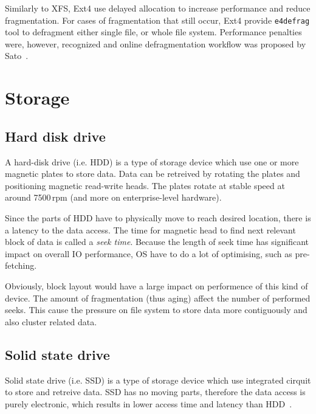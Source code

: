 \documentclass[
  color, %
  table, %
  lof,   %
  lot,   %
]{fithesis3}
\begin{document}
Similarly to XFS, Ext4 use delayed allocation to increase performance and reduce fragmentation. For cases of fragmentation that still occur, Ext4 provide \texttt{e4defrag} tool to defragment either single file, or whole file system. Performance penalties were, however, recognized and online defragmentation workflow was proposed by Sato~\cite{sato2007:ext4}.




\section{Storage}
\subsection{Hard disk drive}
A hard-disk drive (i.e. HDD) is a type of storage device which use one or more magnetic plates to store data. Data can be retreived by rotating the plates and positioning magnetic read-write heads. The plates rotate at stable speed at around 7500\,rpm (and more on enterprise-level hardware).

Since the parts of HDD have to physically move to reach desired location, there is a latency to the data access. The time for magnetic head to find next relevant block of data is called a \emph{seek time}. Because the length of seek time has significant impact on overall IO performance, OS have to do a lot of optimising, such as pre-fetching.

Obviously, block layout would have a large impact on performence of this kind of device. The amount of fragmentation (thus aging) affect the number of performed seeks. This cause the pressure on file system to store data more contiguously and also cluster related data.

\subsection{Solid state drive}
Solid state drive (i.e. SSD) is  a type of storage device which use integrated cirquit to store and retreive data. SSD has no moving parts, therefore the data access is purely electronic, which results in lower access time and latency than HDD~\cite{kasavajhala2011solid}.
\end{document}
